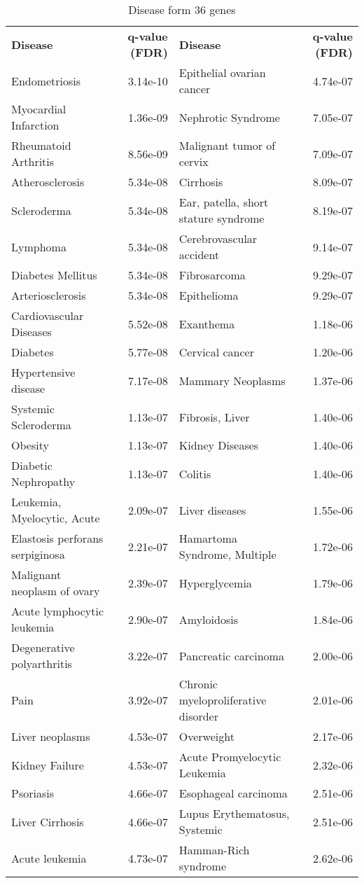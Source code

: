 \documentclass[fleqn,10pt]{SelfArx} %
\begin{document}
\begin{table}[ht]
	\centering
	\begin{tabularx}{\textwidth}{lRlR}
		\textbf{\color{white} Disease} & \textbf{\color{white} q-value (FDR)} & \textbf{\color{white} Disease} & \textbf{\color{white} q-value (FDR)} \\
		Endometriosis & 3.14e-10 & Epithelial ovarian cancer & 4.74e-07 \\ 
		Myocardial Infarction & 1.36e-09 & Nephrotic Syndrome & 7.05e-07 \\ 
		Rheumatoid Arthritis & 8.56e-09 & Malignant tumor of cervix & 7.09e-07 \\ 
		Atherosclerosis & 5.34e-08 & Cirrhosis & 8.09e-07 \\ 
		Scleroderma & 5.34e-08 & Ear, patella, short stature syndrome & 8.19e-07 \\ 
		Lymphoma & 5.34e-08 & Cerebrovascular accident & 9.14e-07 \\ 
		Diabetes Mellitus & 5.34e-08 & Fibrosarcoma & 9.29e-07 \\ 
		Arteriosclerosis & 5.34e-08 & Epithelioma & 9.29e-07 \\ 
		Cardiovascular Diseases & 5.52e-08 & Exanthema & 1.18e-06 \\ 
		Diabetes & 5.77e-08 & Cervical cancer & 1.20e-06 \\ 
		Hypertensive disease & 7.17e-08 & Mammary Neoplasms & 1.37e-06 \\ 
		Systemic Scleroderma & 1.13e-07 & Fibrosis, Liver & 1.40e-06 \\ 
		Obesity & 1.13e-07 & Kidney Diseases & 1.40e-06 \\ 
		Diabetic Nephropathy & 1.13e-07 & Colitis & 1.40e-06 \\ 
		Leukemia, Myelocytic, Acute & 2.09e-07 & Liver diseases & 1.55e-06 \\ 
		Elastosis perforans serpiginosa & 2.21e-07 & Hamartoma Syndrome, Multiple & 1.72e-06 \\ 
		Malignant neoplasm of ovary & 2.39e-07 & Hyperglycemia & 1.79e-06 \\ 
		Acute lymphocytic leukemia & 2.90e-07 & Amyloidosis & 1.84e-06 \\ 
		Degenerative polyarthritis & 3.22e-07 & Pancreatic carcinoma & 2.00e-06 \\ 
		Pain & 3.92e-07 & Chronic myeloproliferative disorder & 2.01e-06 \\ 
		Liver neoplasms & 4.53e-07 & Overweight & 2.17e-06 \\ 
		Kidney Failure & 4.53e-07 & Acute Promyelocytic Leukemia & 2.32e-06 \\ 
		Psoriasis & 4.66e-07 & Esophageal carcinoma & 2.51e-06 \\ 
		Liver Cirrhosis & 4.66e-07 & Lupus Erythematosus, Systemic & 2.51e-06 \\ 
		Acute leukemia & 4.73e-07 & Hamman-Rich syndrome & 2.62e-06 \\ 
	\end{tabularx}
	\smallskip
	\caption{Disease form 36 genes}
	\label{tab:diseases}
\end{table}
\end{document}

